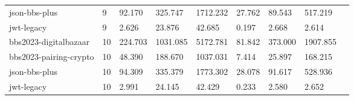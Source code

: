 \begin{table}[t]
\begin{tabular}{lllllllll}
json-bbs-plus & 9 & 92.170 & 325.747 & 1712.232 & 27.762 & 89.543 & 517.219 \\
jwt-legacy & 9 & 2.626 & 23.876 & 42.685 & 0.197 & 2.668 & 2.614 \\
bbs2023-digitalbazaar & 10 & 224.703 & 1031.085 & 5172.781 & 81.842 & 373.000 & 1907.855 \\
bbs2023-pairing-crypto & 10 & 48.390 & 188.670 & 1037.031 & 7.414 & 25.897 & 168.215 \\
json-bbs-plus & 10 & 94.309 & 335.379 & 1773.302 & 28.078 & 91.617 & 528.936 \\
jwt-legacy & 10 & 2.991 & 24.145 & 42.429 & 0.233 & 2.580 & 2.652 \\
\bottomrule
\end{tabular}
\end{table}
